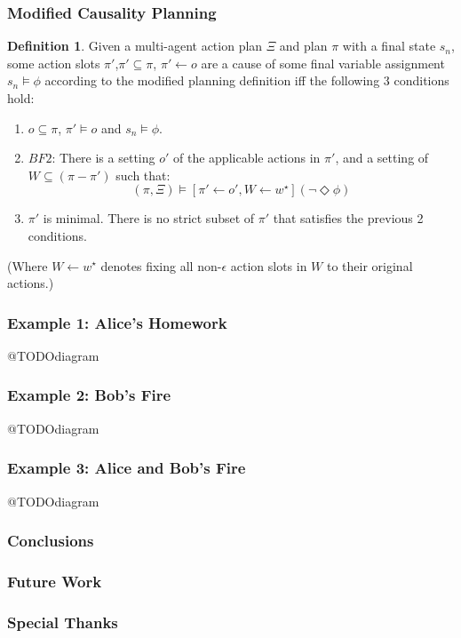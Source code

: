 \documentclass{beamer}
\theoremstyle{plain}
\theoremstyle{definition}
\newtheorem{defn}[thm]{Definition} %
\begin{document}
\begin{frame}
\frametitle{Modified Causality Planning}
\begin{defn}
Given a multi-agent action plan $\Xi$ and plan $\pi$ with a final state $s_n$, some action slots $\pi'$,$\pi' \subseteq \pi$, $\pi' \leftarrow o$ are a cause of some final variable assignment $s_n \models \phi$ according to the modified planning definition iff the following 3 conditions hold:
\begin{enumerate}
\item  $o \subseteq \pi$, $\pi' \models o$ and $s_n \models \phi$.
\item $BF2$: There is a setting $o'$ of the applicable actions in $\pi'$, and a setting of $W \subseteq (\pi  - \pi')$ such that:
\[
(\pi, \Xi) \models [\pi' \leftarrow o', W \leftarrow w^\star](\lnot \Diamond \phi)
\]
\item $\pi'$ is minimal. There is no strict subset of $\pi'$ that satisfies the previous 2 conditions.
\end{enumerate}


(Where $W\leftarrow w^\star$ denotes fixing all non-$\epsilon$ action slots in $W$ to their original actions.)

\end{defn}

\end{frame}

\begin{frame}
\frametitle{Example 1: Alice's Homework}
@TODOdiagram
\end{frame}


\begin{frame}
\frametitle{Example 2: Bob's Fire}
@TODOdiagram
\end{frame}


\begin{frame}
\frametitle{Example 3: Alice and Bob's Fire}
@TODOdiagram
\end{frame}


\begin{frame}
\frametitle{Conclusions}

\end{frame}


\begin{frame}
\frametitle{Future Work}

\end{frame}

\begin{frame}
\frametitle{Special Thanks}

\end{frame}
\end{document}
